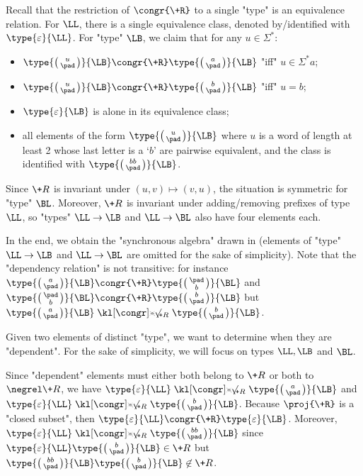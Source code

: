 \begin{example}
	Recall that the restriction of $\congr{\+R}$ to a single "type" is
	an equivalence relation. For $\LL$, there is a single equivalence class,
	denoted by/identified with $\type{\varepsilon}{\LL}$.
	For "type" $\LB$, we claim that for any $u \in \Sigma^*$:
	\begin{multicols}{2}
	\begin{itemize}
		\item $\type{\pair{u}{\pad}}{\LB} \congr{\+R} \type{\pair{a}{\pad}}{\LB}$ "iff" $u \in \Sigma^* a$;
		\item $\type{\pair{u}{\pad}}{\LB} \congr{\+R} \type{\pair{b}{\pad}}{\LB}$ "iff" $u = b$;
		\item $\type{\varepsilon}{\LB}$ is alone in its equivalence class;
		\columnbreak
		\item all elements of the form $\type{\pair{u}{\pad}}{\LB}$ where $u$ is a word of length at least 2 whose last letter is a `$b$' are pairwise equivalent, and the class is identified with $\type{\pair{bb}{\pad}}{\LB}$.
	\end{itemize}
	\end{multicols}
	Since $\+R$ is invariant under $(u,v) \mapsto (v,u)$, the situation is symmetric for "type" $\BL$. Moreover, $\+R$ is invariant under adding/removing prefixes of type $\LL$,
	so "types" $\LL \to \LB$ and $\LL\to\BL$ also have four elements each.

	In the end, we obtain the "synchronous algebra" drawn in  (elements of "type" $\LL\to\LB$ and $\LL\to\BL$ are omitted for the sake of simplicity).
	Note that the "dependency relation" is not transitive:
	for instance $\type{\pair{a}{\pad}}{\LB} \congr{\+R} \type{\pair{\pad}{b}}{\BL}$
	and $\type{\pair{\pad}{b}}{\BL} \congr{\+R} \type{\pair{b}{\pad}}{\LB}$
	but $\type{\pair{a}{\pad}}{\LB} \notcongr{\+R} \type{\pair{b}{\pad}}{\LB}$.

Given two elements of distinct "type", we want to determine
when they are "dependent". For the sake of simplicity,
we will focus on types $\LL, \LB$ and $\BL$.

Since "dependent" elements must either both belong to $\+R$ or both to $\negrel\+R$,
we have $\type{\varepsilon}{\LL} \notcongr{\+R} \type{\pair{a}{\pad}}{\LB}$
and $\type{\varepsilon}{\LL} \notcongr{\+R} \type{\pair{b}{\pad}}{\LB}$.
Because $\proj{\+R}$ is a "closed subset",
then $\type{\varepsilon}{\LL} \congr{\+R} \type{\varepsilon}{\LB}$.
Moreover, $\type{\varepsilon}{\LL} \notcongr{\+R} \type{\pair{bb}{\pad}}{\LB}$ since
$\type{\varepsilon}{\LL} \type{\pair{b}{\pad}}{\LB} \in \+R$
but $\type{\pair{bb}{\pad}}{\LB} \type{\pair{b}{\pad}}{\LB} \not\in \+R$.


\end{example}
